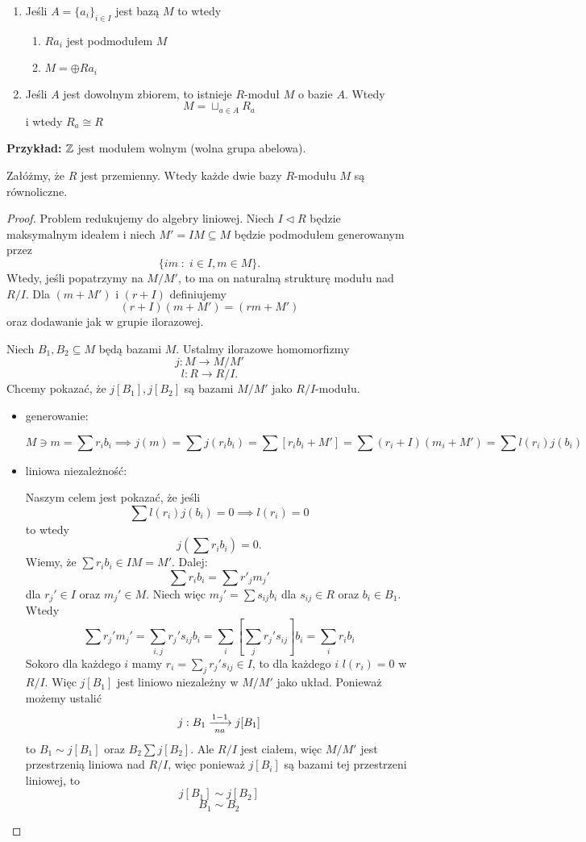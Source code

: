 \begin{remark}$ $\newline
  \begin{enumerate}
    \item Jeśli $A=\{a_i\}_{i\in I}$ jest bazą $M$ to wtedy
      \begin{enumerate}
        \item $Ra_i$ jest  podmodułem $M$
        \item $M=\oplus Ra_i$
      \end{enumerate}
    \item Jeśli $A$ jest dowolnym zbiorem, to istnieje $R$-moduł $M$ o bazie $A$. Wtedy
        $$M=\sqcup_{a\in A} R_a$$
        i wtedy $R_a\cong R$
  \end{enumerate}
\end{remark}
\textbf{Przykład:} $\mathbb{Z}$ jest modułem wolnym (wolna grupa abelowa).

\begin{theorem}
  Załóżmy, że $R$ jest przemienny. Wtedy każde dwie bazy $R$-modułu $M$ są równoliczne.
\end{theorem}
\begin{proof}
  Problem redukujemy do algebry liniowej. Niech $I\triangleleft R$ będzie maksymalnym ideałem i niech $M'=IM\subseteq M$ będzie podmodułem generowanym przez
  $$\{im\;:\;i\in I,m\in M\}.$$
  Wtedy, jeśli popatrzymy na $M/M'$, to ma on naturalną strukturę modułu nad $R/I$. Dla $(m+M')$ i $(r+I)$ definiujemy
  $$(r+I)(m+M')=(rm+M')$$
  oraz dodawanie jak w grupie ilorazowej.

  Niech $B_1,B_2\subseteq M$ będą bazami $M$. Ustalmy ilorazowe homomorfizmy
  $$j:M\to M/M'$$
  $$l:R\to R/I.$$
  Chcemy pokazać, że $j[B_1],j[B_2]$ są bazami $M/M'$ jako $R/I$-modułu.
  \begin{itemize}
    \item generowanie:
      
      $$M\ni m=\sum r_ib_i\implies j(m)=\sum j(r_ib_i)=\sum [r_ib_i+M']=\sum (r_i+I)(m_i+M')=\sum l(r_i)j(b_i)$$
    \item liniowa niezależność:

      Naszym celem jest pokazać, że jeśli 
      $$\sum l(r_i)j(b_i)=0\implies l(r_i)=0$$
      to wtedy
      $$j(\sum r_ib_i)=0.$$
      Wiemy, że $\sum r_ib_i\in IM=M'$. Dalej:
      $$\sum r_ib_i=\sum r'_jm_j'$$
      dla $r_j'\in I$ oraz $m_j'\in M$. Niech więc $m_j'=\sum s_{ij}b_i$ dla $s_{ij}\in R$ oraz $b_i\in B_1$. Wtedy
      $$\sum r_j'm_j'=\sum_{i,j} r_j's_{ij}b_i=\sum_i\left[\sum_j r_j's_{ij}\right]b_i=\sum_ir_ib_i$$
      Sokoro dla każdego $i$ mamy $r_i=\sum_jr_j's_{ij}\in I$, to dla każdego $i$ $l(r_i)=0$ w $R/I$. Więc $j[B_1]$ jest liniowo niezależny w $M/M'$ jako układ. Ponieważ możemy ustalić
      $$j:B_1\xrightarrow[na]{1-1} j[B_1]$$
      to $B_1\sim j[B_1]$ oraz $B_2\sum j[B_2]$. Ale $R/I$ jest ciałem, więc $M/M'$ jest przestrzenią liniowa nad $R/I$, więc ponieważ $j[B_i]$ są bazami tej przestrzeni liniowej, to
      $$j[B_1]\sim j[B_2]$$
      $$B_1\sim B_2$$
  \end{itemize}
\end{proof}

